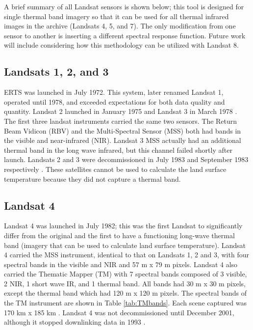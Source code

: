 \documentclass{book}
\begin{document}
A brief summary of all Landsat sensors is shown below;  this tool is designed for single thermal band imagery so that it can be used for all thermal infrared images in the archive (Landsats 4, 5, and 7).  The only modification from one sensor to another is inserting a different spectral response function.  Future work will include considering how this methodology can be utilized with Landsat 8.

\subsection{Landsats 1, 2, and 3}
\label{sec:landsats123}

ERTS was launched in July 1972.  This system, later renamed Landsat 1, operated until 1978, and exceeded expectations for both data quality and quantity.  Landsat 2 launched in January 1975 and Landsat 3 in March 1978 \cite{landsat_nasa}.  The first three landsat instruments carried the same two sensors.  The Return Beam Vidicon (RBV) and the Multi-Spectral Sensor (MSS) both had bands in the visible and near-infrared (NIR).  Landsat 3 MSS actually had an additional thermal band in the long wave infrared, but this channel failed shortly after launch.  Landsats 2 and 3 were decommissioned in July 1983 and September 1983 respectively \cite{landsat_nasa}.  These satellites cannot be used to calculate the land surface temperature because they did not capture a thermal band.

\subsection{Landsat 4}
\label{sec:landsat4}

Landsat 4 was launched in July 1982; this was the first Landsat to significantly differ from the original and the first to have a functioning long-wave thermal band (imagery that can be used to calculate land surface temperature).  Landsat 4 carried the MSS instrument, identical to that on Landsats 1, 2 and 3, with four spectral bands in the visible and NIR and 57 m x 79 m pixels.  Landsat 4 also carried the Thematic Mapper (TM) with 7 spectral bands composed of 3 visible, 2 NIR, 1 short wave IR, and 1 thermal band.  All bands had 30 m x 30 m pixels, except the thermal band which had 120 m x 120 m pixels.  The spectral bands of the TM instrument are shown in Table \ref{tab:TMbands}.  Each scene captured was 170 km x 185 km \cite{landsat_usgs}.  Landsat 4 was not decommissioned until December 2001, although it stopped downlinking data in 1993 \cite{landsat_nasa}.
\end{document}
